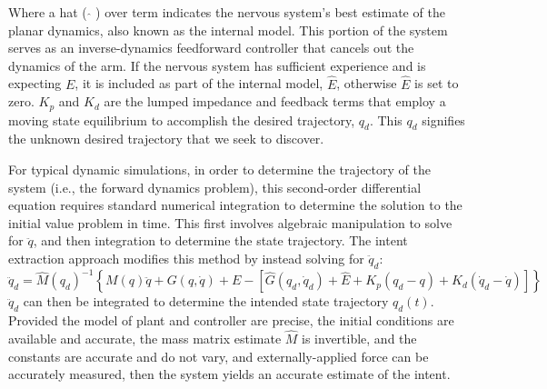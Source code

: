 \documentclass[10pt]{article}
\begin{document}
Where a hat ( $\hat{ }$ ) over term indicates the nervous system's best estimate of the planar dynamics, also known as the internal model. This portion of the system serves as an inverse-dynamics feedforward controller that cancels out the dynamics of the arm. If the nervous system has sufficient experience and is expecting $E$, it is included as part of the internal model, $\hat{E}$, otherwise $\hat{E}$ is set to zero. $K_p$ and $K_d$ are the lumped impedance and feedback terms that employ a moving state equilibrium to accomplish the desired trajectory, $q_d$. This $q_d$ signifies the unknown desired trajectory that we seek to discover.

For typical dynamic simulations, in order to determine the trajectory of the system (i.e., the forward dynamics problem), this second-order differential equation requires standard numerical integration to determine the solution to the initial value problem in time. This first involves algebraic manipulation to solve for $\ddot{q}$, and then integration to determine the state trajectory. The intent extraction approach modifies this method by instead solving for $\ddot{q}_d$:
\begin{equation}
\ddot{q}_d=\hat{M}(q_d)^{-1}\left\{M(q)\ddot{q}+G(q,\dot{q})+E-[\hat{G}(q_d,\dot{q}_d)+\hat{E}+K_p(q_d-q)+K_d(\dot{q}_d-\dot{q})]\right\}
\end{equation}  
$\ddot{q}_d$ can then be integrated to determine the intended state trajectory $q_d(t)$. Provided the model of plant and controller are precise, the initial conditions are available and accurate, the mass matrix estimate $\hat{M}$ is invertible, and the constants are accurate and do not vary, and externally-applied force can be accurately measured, then the system yields an accurate estimate of the intent.
\end{document}
